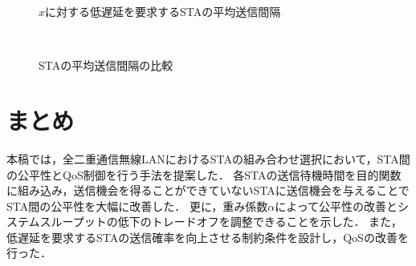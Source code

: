 \documentclass[technicalreport]{ieicej}
\begin{document}
	\begin{figure}[t]
		\centering
		\caption{$x$に対する低遅延を要求するSTAの平均送信間隔}
		\label{fig:chnx}
	\end{figure}

	\begin{figure}[t]
		\centering
		\\
		\caption{STAの平均送信間隔の比較}
		\label{fig:inter}
	\end{figure}

\section{まとめ}
本稿では，全二重通信無線LANにおけるSTAの組み合わせ選択において，STA間の公平性とQoS制御を行う手法を提案した．
各STAの送信待機時間を目的関数に組み込み，送信機会を得ることができていないSTAに送信機会を与えることで
STA間の公平性を大幅に改善した．
更に，重み係数$\alpha$によって公平性の改善とシステムスループットの低下のトレードオフを調整できることを示した．
また，低遅延を要求するSTAの送信確率を向上させる制約条件を設計し，QoSの改善を行った．



\end{document}
